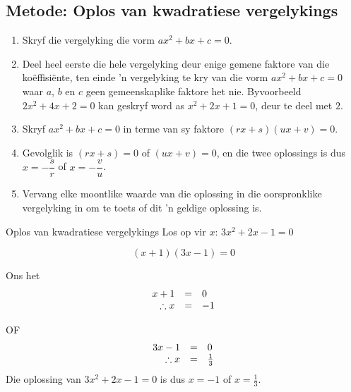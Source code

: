 \subsection*{Metode: Oplos van kwadratiese vergelykings}
\begin{enumerate}[noitemsep, label=\textbf{\arabic*}. ] 
\item Skryf die vergelyking die vorm $ax^{2} +bx +c =0$.
\item Deel heel eerste die hele vergelyking deur enige gemene faktore van die koëffisiënte, ten einde ’n vergelyking te kry van die vorm $a{x}^{2}+bx+c=0$ waar $a$, $b$ en
$c$ geen gemeenskaplike faktore het nie. Byvoorbeeld $2{x}^{2}+4x+2=0$ kan geskryf word as
${x}^{2}+2x+1=0$, deur te deel met $2$.
\item Skryf $a{x}^{2}+bx+c=0$ in terme van sy faktore  $(rx+s)(ux+v)=0$.

\item Gevolglik is $(rx+s)=0$ of $(ux+v)=0$, en die twee oplossings is dus $x = -\dfrac{s}{r}$ of $x=-\dfrac{v}{u}$.
\item Vervang elke moontlike waarde van die oplossing in die oorspronklike vergelyking in om te toets of dit ’n
geldige oplossing is.

\end{enumerate}

        
\begin{wex}
{Oplos van kwadratiese vergelykings }
{Los op vir $x$: $3{x}^{2}+2x-1=0$}
{

\begin{equation*}
(x+1)(3x-1)=0
\end{equation*}

Ons het
\begin{equation*}
     \begin{array}{ccc}\hfill x+1&=&0\hfill \\
	\hfill \therefore x&=&-1
    \end{array}
\end{equation*}

OF
\begin{equation*}
     \begin{array}{ccc}\hfill 3x-1&=&0\hfill \\
	\hfill \therefore x&=&\frac{1}{3}
    \end{array}
\end{equation*}
Die oplossing van $3{x}^{2}+2x-1=0$ is dus $x=-1$ of $x=\frac{1}{3}$.
}
\end{wex}



